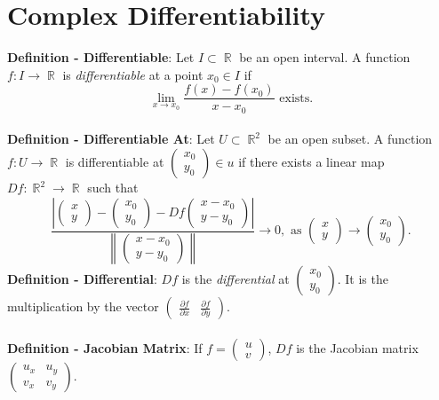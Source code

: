 \documentclass{article}
\DeclareMathOperator{\R}{\mathbb{R}}
\begin{document}
\section*{Complex Differentiability}
\textbf{Definition - Differentiable}: Let $I \subset \R$ be an open interval. A function $f: I \rightarrow \R$ is \textit{differentiable} at a point $x_0 \in I$ if $$\lim_{x \rightarrow x_0} \frac{f(x) - f(x_0)}{x - x_0} \text{ exists.}$$ \\
\textbf{Definition - Differentiable At}: Let $U \subset \R^2$ be an open subset. A function $f: U \rightarrow \R$ is differentiable at $\begin{pmatrix}
    x_0 \\ y_0
\end{pmatrix}\in u$ if there exists a linear map $Df: \R^2 \rightarrow \R$ such that $$\frac{\left|\begin{pmatrix}
    x \\ y
\end{pmatrix} - \begin{pmatrix}
    x_0 \\ y_0
\end{pmatrix} - Df\begin{pmatrix}
    x - x_0 \\ y - y_0
\end{pmatrix}\right|}{\left\lVert \begin{pmatrix}
    x - x_0 \\ y - y_0
\end{pmatrix} \right\rVert} \rightarrow 0, \text{ as } \begin{pmatrix}
    x \\ y
\end{pmatrix} \rightarrow \begin{pmatrix}
    x_0 \\ y_0
\end{pmatrix}.$$
\textbf{Definition - Differential}: $Df$ is the \textit{differential} at $\begin{pmatrix}
    x_0 \\ y_0
\end{pmatrix}$. It is the multiplication by the vector $\begin{pmatrix}
    \frac{\partial f}{\partial x} & \frac{\partial f}{\partial y}
\end{pmatrix}$. \\ \\
\textbf{Definition - Jacobian Matrix}: If $f = \begin{pmatrix}
    u \\ v
\end{pmatrix}$, $Df$ is the Jacobian matrix $\begin{pmatrix}
    u_x & u_y \\ v_x & v_y
\end{pmatrix}$. \\ \\
\end{document}
